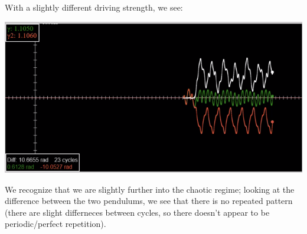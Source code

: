 \documentclass[../PHYS306Notes.tex]{subfiles}
\begin{document}
With a slightly different driving strength, we see:
\begin{center}
    \includegraphics[scale=0.7]{Lecture-33/l33-img4.png}
\end{center}
We recognize that we are slightly further into the chaotic regime; looking at the difference between the two pendulums, we see that there is no repeated pattern (there are slight differneces between cycles, so there doesn't appear to be periodic/perfect repetition).
\end{document}
